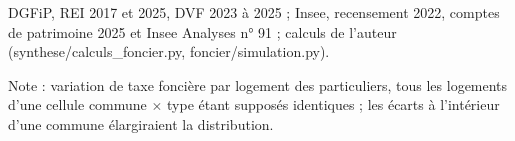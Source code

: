 DGFiP, REI 2017 et 2025, DVF 2023 à 2025 ; Insee, recensement 2022, comptes de patrimoine 2025 et Insee Analyses n° 91 ; calculs de l'auteur (synthese/calculs\_foncier.py, foncier/simulation.py).\par Note : variation de taxe foncière par logement des particuliers, tous les logements d'une cellule commune $\times$ type étant supposés identiques ; les écarts à l'intérieur d'une commune élargiraient la distribution.
